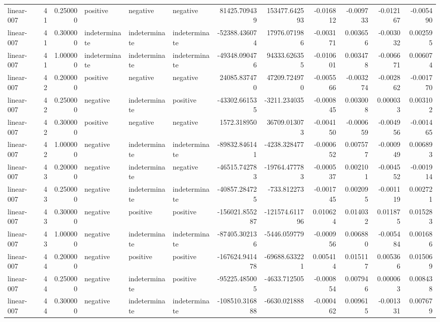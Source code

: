 \begin{tabular}{lrrlllrrrrrr}
linear-007 & 41 & 0.250000 & positive & negative & negative & 81425.709439 & 153477.642593 & -0.016812 & -0.009733 & -0.012167 & -0.005490 \\
linear-007 & 41 & 0.300000 & indeterminate & indeterminate & indeterminate & -52388.436074 & 17976.071986 & -0.003171 & 0.003656 & -0.003032 & 0.002595 \\
linear-007 & 41 & 1.000000 & indeterminate & indeterminate & indeterminate & -49348.090476 & 94333.626355 & -0.010601 & 0.003478 & -0.006671 & 0.006074 \\
linear-007 & 42 & 0.200000 & positive & negative & negative & 24085.837470 & 47209.724970 & -0.005566 & -0.003274 & -0.002862 & -0.001770 \\
linear-007 & 42 & 0.250000 & negative & indeterminate & positive & -43302.661535 & -3211.234035 & -0.000845 & 0.003008 & 0.000033 & 0.003102 \\
linear-007 & 42 & 0.300000 & positive & negative & negative & 1572.318950 & 36709.013073 & -0.004150 & -0.000659 & -0.004956 & -0.001465 \\
linear-007 & 42 & 1.000000 & negative & indeterminate & indeterminate & -89832.846141 & -4238.328477 & -0.000652 & 0.007577 & -0.000949 & 0.006893 \\
linear-007 & 43 & 0.200000 & negative & indeterminate & negative & -46515.742783 & -19764.477783 & -0.000537 & 0.002101 & -0.004552 & -0.001914 \\
linear-007 & 43 & 0.250000 & negative & indeterminate & indeterminate & -40857.284725 & -733.812273 & -0.001745 & 0.002095 & -0.001119 & 0.002721 \\
linear-007 & 43 & 0.300000 & negative & positive & positive & -156021.855287 & -121574.611796 & 0.010624 & 0.014032 & 0.011875 & 0.015283 \\
linear-007 & 43 & 1.000000 & negative & indeterminate & indeterminate & -87405.302136 & -5446.059779 & -0.000956 & 0.006880 & -0.005484 & 0.001686 \\
linear-007 & 44 & 0.200000 & negative & positive & positive & -167624.941478 & -69688.633221 & 0.005414 & 0.015117 & 0.005366 & 0.015069 \\
linear-007 & 44 & 0.250000 & negative & indeterminate & positive & -95225.485005 & -4633.712505 & -0.000854 & 0.007946 & 0.000063 & 0.008438 \\
linear-007 & 44 & 0.300000 & negative & indeterminate & indeterminate & -108510.316888 & -6630.021888 & -0.000462 & 0.009615 & -0.001331 & 0.007679 \\

\end{tabular}
